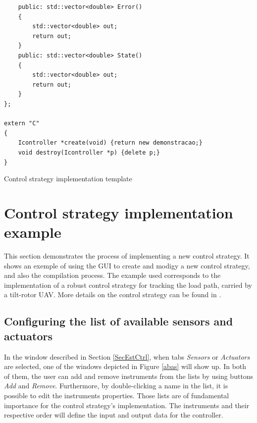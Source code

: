 \newpage


	

\begin{code}[H]
\begin{verbatim}
	public: std::vector<double> Error()
	{
		std::vector<double> out;
		return out;
	}
	public: std::vector<double> State()
	{
		std::vector<double> out;
		return out;
	}
};

extern "C"
{
	Icontroller *create(void) {return new demonstracao;}
	void destroy(Icontroller *p) {delete p;}
}
\end{verbatim}
\caption{Control strategy implementation template}
\label{template}
\end{code} 

\section{Control strategy implementation example}
\label{exemplo}

This section demonstrates the process of implementing a new control strategy. It shows an exemple of using the GUI to create and modigy a new control strategy, and also the compilation process. The example used corresponds to the implementation of a robust control strategy for tracking the load path, carried by a tilt-rotor UAV. More details on the control strategy can be found in \cite{Lara2017}.

\subsection{Configuring the list of available sensors and actuators}

In the window described in Section \ref{SecEstCtrl}, when tabs \textit{Sensors} or \textit{Actuators} are selected, one of the windows depicted in Figure \ref{abas} will show up. In both of them, the user can add and remove instruments from the lists by using buttons \textit{Add} and \textit{Remove}. Furthermore, by double-clicking a name in the list, it is possible to edit the instruments properties. Those lists are of fundamental importance for the control strategy's implementation. The instruments and their respective order will define the input and output data for the controller.

